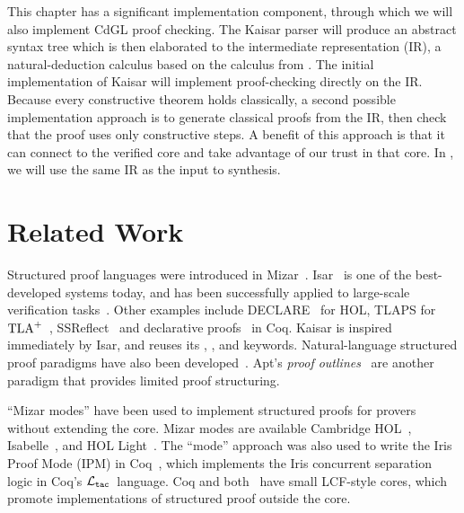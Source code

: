 \documentclass[12pt]{cmuthesis}
\theoremstyle{definition}
\theoremstyle{remark}
\newcommand{\rref}[2][]{\prettyref{#2}}
\newcommand{\CdGL}{\textsf{CdGL}\xspace}
\newcommand{\ltac}{\ensuremath{\mathcal{L}_{\tt tac}}~}
\begin{document}
This chapter has a significant implementation component, through which we will also implement \CdGL proof checking.
The Kaisar parser will produce an abstract syntax tree which is then elaborated to the intermediate representation (IR), a natural-deduction calculus based on the calculus from \rref{ch:cdgl}.
The initial implementation of Kaisar will implement proof-checking directly on the IR.
Because every constructive theorem holds classically, a second possible implementation approach is to generate classical \dGL proofs from the IR, then check that the proof uses only constructive steps.
A benefit of this approach is that it can connect to the verified \KeYmaeraX core and take advantage of our trust in that core.
In \rref{ch:proofplex}, we will use the same IR as the input to synthesis.


\section{Related Work}
\label{sec:kaisar-relwork}
Structured proof languages were introduced in Mizar~\cite{conf/mkm/BancerekBGKMNPU15,Wenzel2002}.
Isar~\cite{DBLP:conf/mkm/Wenzel06,DBLP:conf/tphol/Wenzel99,Wenzel07isabelle/isar} is one of the best-developed systems today, and has been successfully applied to large-scale verification tasks~\cite{Nipkow2002,DBLP:journals/cacm/KleinAEHCDEEKNSTW10,DBLP:journals/afp/Lochbihler07}.
Other examples include DECLARE~\cite{Syme1997DECLAREAP} for HOL, TLAPS for ${\rm TLA}^+$~\cite{DBLP:conf/fm/CousineauDLMRV12,DBLP:conf/hybrid/Lamport92}, SSReflect~\cite{DBLP:journals/jfrea/GonthierM10} and declarative proofs~\cite{DBLP:conf/types/Corbineau07} in Coq.
Kaisar is inspired immediately by Isar, and reuses its \kwnote{}, \kwshow{}, and \kwhave{} keywords.
Natural-language structured proof paradigms have also been developed~\cite{Lamport12,Lamport95}.
Apt's \emph{proof outlines}~\cite{apt2010verification} are another paradigm that provides limited proof structuring.

``Mizar modes'' have been used to implement structured proofs for provers without extending the core.
Mizar modes are available Cambridge HOL~\cite{DBLP:conf/tphol/Harrison96}, Isabelle~\cite{DBLP:conf/cpp/KaliszykPU16}, and HOL Light~\cite{DBLP:conf/tphol/Wiedijk01}.
The ``mode'' approach was also used to write the Iris Proof Mode (IPM) in Coq~\cite{DBLP:conf/popl/KrebbersTB17}, which implements the Iris concurrent separation logic in Coq's \ltac language.
Coq and \KeYmaeraX both~\cite{Barras:1997,BohrerCPP17} have small LCF-style cores, which promote implementations of structured proof outside the core.
\end{document}

